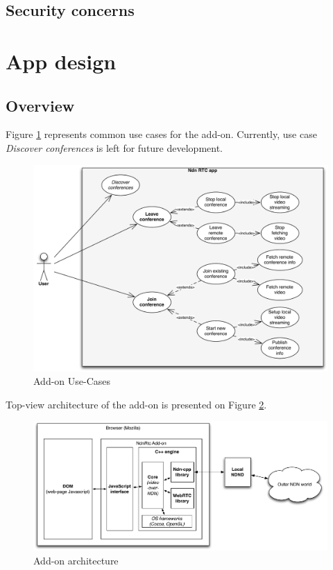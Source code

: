 \documentclass[12pt]{article}
\begin{document}
\subsection{Security concerns}

\section{App design}
\subsection{Overview}
Figure \ref{fig:uc} represents common use cases for the add-on. Currently, use case \textit{Discover conferences} is left for future development.
\begin{figure}
\centering
\includegraphics[width=\textwidth]{../res/graphics/addon-uc}
\caption{Add-on Use-Cases}
\label{fig:uc}
\end{figure}

Top-view architecture of the add-on is presented on Figure \ref{fig:arch}.
\begin{figure}
\centering
\includegraphics[width=\textwidth]{../res/graphics/addon-arch}
\caption{Add-on architecture}
\label{fig:arch}
\end{figure}
\end{document}
